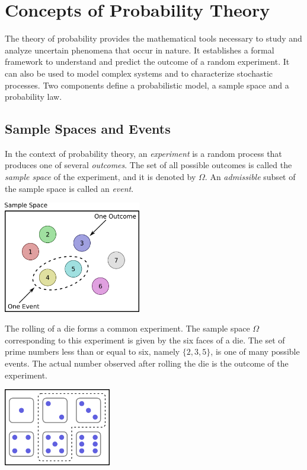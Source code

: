 \chapter{Concepts of Probability Theory}

The theory of probability provides the mathematical tools necessary to study and analyze uncertain phenomena that occur in nature.
It establishes a formal framework to understand and predict the outcome of a random experiment.
It can also be used to model complex systems and to characterize stochastic processes.
Two components define a probabilistic model, a sample space and a probability law.


\section{Sample Spaces and Events}

In the context of probability theory, an \emph{experiment} is a random process that produces one of several \emph{outcomes}.
The set of all possible outcomes is called the \emph{sample space} of the experiment, and it is denoted by $\Omega$.
An \emph{admissible} subset of the sample space is called an \emph{event}.

\begin{center}
\includegraphics[height=4.85cm]{Figures/2Chapter/samplespace}
\end{center}

\begin{example}
The rolling of a die forms a common experiment.
The sample space $\Omega$ corresponding to this experiment is given by the six faces of a die.
The set of prime numbers less than or equal to six, namely $\{ 2, 3, 5 \}$, is one of many possible events.
The actual number observed after rolling the die is the outcome of the experiment.

\begin{center}
\includegraphics[height=3.375cm]{Figures/2Chapter/dices}
\end{center}
\end{example}

